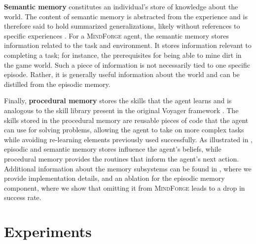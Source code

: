 \documentclass{article}
\newcommand{\collabvoyager}[0]{\mbox{\textsc{MindForge}}\xspace}
\begin{document}
\textbf{Semantic memory} constitutes an individual's store of knowledge about the world. The content of semantic memory is abstracted from the experience and is therefore said to hold summarized generalizations, likely without references to specific experiences \cite{Binder2011-gq, Klein2009-vz, Klein1993-vu}. For a \collabvoyager agent, the semantic memory stores information related to the task and environment. It stores information relevant to completing a task; for instance, the prerequisites for being able to mine dirt in the game world. Such a piece of information is not necessarily tied to one specific episode. Rather, it is generally useful information about the world and can be distilled from the episodic memory.

Finally, \textbf{procedural memory} stores the skills that the agent learns and is analogous to the skill library present in the original Voyager framework \cite{wang2023voyager}.  The skills stored in the procedural memory are reusable pieces of code that the agent can use for solving problems, allowing the agent to take on more complex tasks while avoiding re-learning elements previously used successfully. 
As illustrated in , episodic and semantic memory stores influence the agent's beliefs, while procedural memory provides the routines that inform the agent's next action. Additional information about the memory subsystems can be found in , where we provide implementation details, and an ablation for the episodic memory component, where we show that omitting it from \collabvoyager leads to a drop in success rate. 

\section{Experiments}
\label{sec:experiments}
\end{document}
